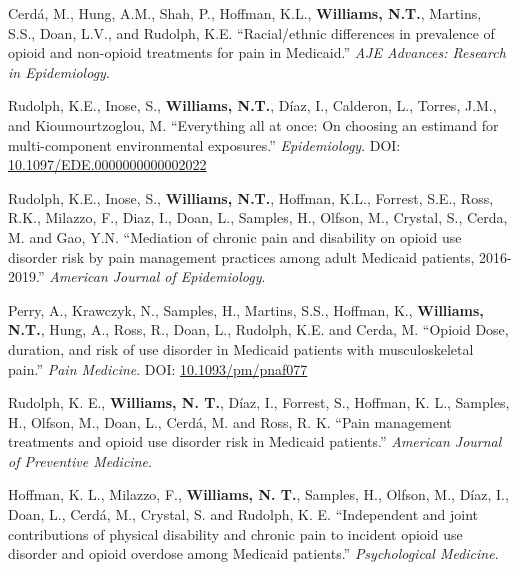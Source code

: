 \documentclass[12pt,letterpaper]{report}
\begin{document}
    \begin{tablist}
    
    \item[2026] \tab Cerdá, M., Hung, A.M., Shah, P., Hoffman, K.L., \textbf{Williams, N.T.}, Martins, S.S., Doan, L.V., and Rudolph, K.E. \enquote{Racial/ethnic differences in prevalence of opioid and non-opioid treatments for pain in Medicaid.} \textit{AJE Advances: Research in Epidemiology}. 
    
    \item[2026] \tab Rudolph, K.E., Inose, S., \textbf{Williams, N.T.}, Díaz, I., Calderon, L., Torres, J.M., and Kioumourtzoglou, M. \enquote{Everything all at once: On choosing an estimand for multi-component environmental exposures.} \textit{Epidemiology}. DOI: \href{https://doi.org/10.1097/EDE.0000000000002022}{10.1097/EDE.0000000000002022}
    
    \item[2025] \tab Rudolph, K.E., Inose, S., \textbf{Williams, N.T.}, Hoffman, K.L., Forrest, S.E., Ross, R.K., Milazzo, F., Diaz, I., Doan, L., Samples, H., Olfson, M., Crystal, S., Cerda, M. and Gao, Y.N. \enquote{Mediation of chronic pain and disability on opioid use disorder risk by pain management practices among adult Medicaid patients, 2016-2019.} \textit{American Journal of Epidemiology}.
    
    \item[2025] \tab Perry, A., Krawczyk, N., Samples, H., Martins, S.S., Hoffman, K., \textbf{Williams, N.T.}, Hung, A., Ross, R., Doan, L., Rudolph, K.E. and Cerda, M. \enquote{Opioid Dose, duration, and risk of use disorder in Medicaid patients with musculoskeletal pain.} \textit{Pain Medicine}. DOI: \href{https://doi.org/10.1093/pm/pnaf077}{10.1093/pm/pnaf077} 
    
    \item[2024] \tab Rudolph, K. E., \textbf{Williams, N. T.}, Díaz, I., Forrest, S., Hoffman, K. L., Samples, H., Olfson, M., Doan, L., Cerdá, M. and Ross, R. K. \enquote{Pain management treatments and opioid use disorder risk in Medicaid patients.} \textit{American Journal of Preventive Medicine}.
    
    \item[2024] \tab Hoffman, K. L., Milazzo, F., \textbf{Williams, N. T.}, Samples, H., Olfson, M., Díaz, I., Doan, L., Cerdá, M., Crystal, S. and Rudolph, K. E. \enquote{Independent and joint contributions of physical disability and chronic pain to incident opioid use disorder and opioid overdose among Medicaid patients.} \textit{Psychological Medicine}.
    

\end{tablist}
\end{document}
